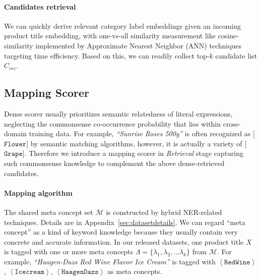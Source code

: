 \paragraph{Candidates retrieval}
We can quickly derive relevant category label embeddings given an incoming product title embedding, with one-vs-all similarity measurement like cosine-similarity
implemented by Approximate Nearest Neighbor (ANN) techniques targeting time efficiency.
Based on this, we can readily collect top-$k$ candidate list $C_{vec}$. 
\subsection{Mapping Scorer}
\label{sec:mapping}
Dense scorer usually prioritizes semantic relatedness of literal expressions, neglecting the commonsense co-occurrence probability that lies within cross-domain training data. For example, \textit{``Sunrise Roses 500g''} is often recognized as [$\mathtt{Flower}$] by semantic matching algorithms, however, it is actually a variety of [$\mathtt{Grape}$]. Therefore we introduce a mapping scorer in \textit{Retrieval} stage capturing such commonsense knowledge to complement the above dense-retrieved candidates.

\paragraph{Mapping algorithm}
The shared meta concept set $\mathcal{M}$ is constructed by hybrid NER-related techniques. 
Details are in Appendix~\ref{sec:datasetdetails}.
We can regard ``meta concept'' as a kind of keyword knowledge because they usually contain very concrete and accurate information. In our released datasets, one product title $X$ is tagged with one or more meta concepts $\Lambda=\{\lambda_1, \lambda_2, ... \lambda_k\}$ from $\mathcal{M}$. For example, \textit{``Haagen-Dazs Red Wine Flavor Ice Cream''} is tagged with $\left\langle \mathtt{Red Wine}\right\rangle$, $\left\langle \mathtt{Ice cream}\right\rangle$, $\left\langle \mathtt{Haagen Dazs}\right\rangle$ as meta concepts.

